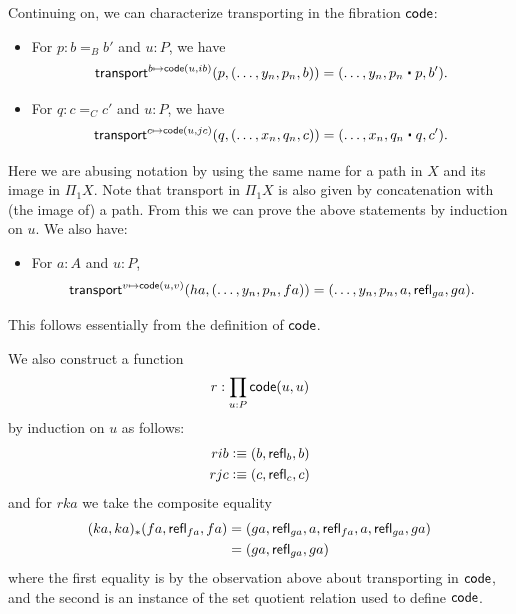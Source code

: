Continuing on, we can characterize transporting in the fibration $\mathsf{code}$:
\begin{itemize}
\item For $p:b=_B b'$ and $u:P$, we have
  \[ \mathsf{transport}^{b\mapsto \code(u,ib)}(p, (\dots, y_n,p_n,b))
  = (\dots,y_n,p_n\ct p,b').
  \]
\item For $q:c=_C c'$ and $u:P$, we have
  \[ \mathsf{transport}^{c\mapsto \code(u,jc)}(q, (\dots, x_n,q_n,c))
  = (\dots,x_n,q_n\ct q,c').
  \]
\end{itemize}
Here we are abusing notation by using the same name for a path in $X$ and its image in $\Pi_1X$.
Note that transport in $\Pi_1X$ is also given by concatenation with (the image of) a path.
From this we can prove the above statements by induction on $u$.
We also have:
\begin{itemize}
\item For $a:A$ and $u:P$,
  \[ \mathsf{transport}^{v\mapsto \mathsf{code}(u,v)}(ha, (\dots, y_n,p_n,fa))
  = (\dots,y_n,p_n,a,\mathsf{refl}_{ga},ga).
  \]
\end{itemize}
This follows essentially from the definition of $\mathsf{code}$.

We also construct a function
\[ r : \prod_{u:P} \mathsf{code}(u,u) \]
by induction on $u$ as follows:
\begin{align*}
  rib &\vcentcolon\equiv (b,\mathsf{refl}_{b},b)\\
  rjc &\vcentcolon\equiv (c,\mathsf{refl}_{c},c)
\end{align*}
and for $rka$ we take the composite equality
\begin{align*}
  (ka,ka)_* (fa,\mathsf{refl}_{fa},fa)
  &= (ga,\mathsf{refl}_{ga},a,\mathsf{refl}_{fa},a,\mathsf{refl}_{ga},ga) \\
  &= (ga,\mathsf{refl}_{ga},ga)
\end{align*}
where the first equality is by the observation above about transporting in $\mathsf{code}$, and the second is an instance of the set quotient relation used to define $\mathsf{code}$.

